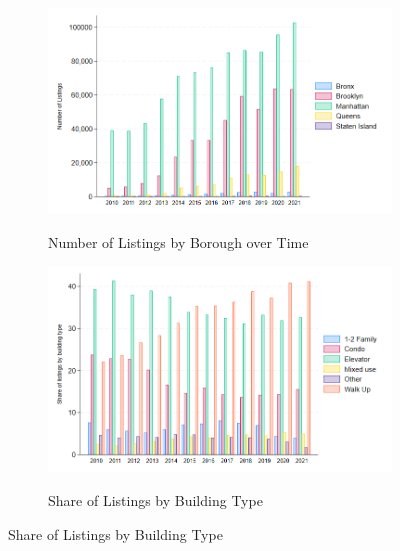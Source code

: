 \documentclass[12pt]{article}
\begin{document}
{{{{{{\begin{figure}[h!]
\caption{Composition of StreetEasy Sample over Time}
\begin{center}
\begin{subfigure}[b]{0.7\textwidth}
\caption{Number of Listings by Borough over Time}
\includegraphics[scale = 0.6]{Samples/R7 SE Composition over Time.png}
\label{fig:seborough}
\end{subfigure}
\hfill
\begin{subfigure}[b]{0.7\textwidth}
\caption{Share of Listings by Building Type}
\includegraphics[scale = 0.6]{Samples/R7 SE Building Type over time.png}
\label{fig:sebuild}
\end{subfigure}
\end{center}
\end{figure}

}}}}}}
\end{document}
